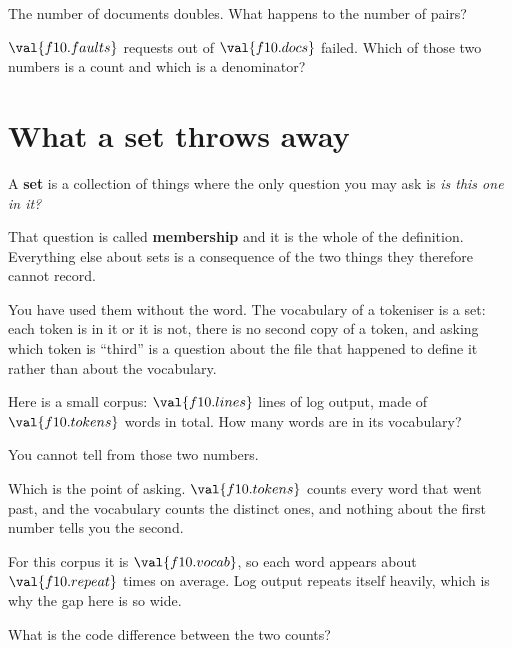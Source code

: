 \begin{quiz}
\item The number of documents doubles. What happens to the number of pairs?
\item $\val{f10.faults}$ requests out of $\val{f10.docs}$ failed. Which of
  those two numbers is a count and which is a denominator?
\end{quiz}

\section{What a set throws away}
\label{sec:F10-sets}

\begin{fr}
A \textbf{set} is a collection of things where the only question you may ask is
\emph{is this one in it?}

That question is called \textbf{membership} and it is the whole of the
definition. Everything else about sets is a consequence of the two things they
therefore cannot record.

You have used them without the word. The vocabulary of a tokeniser is a set:
each token is in it or it is not, there is no second copy of a token, and
asking which token is \enquote{third} is a question about the file that
happened to define it rather than about the vocabulary.

Here is a small corpus: $\val{f10.lines}$ lines of log output, made of
$\val{f10.tokens}$ words in total. How many words are in its vocabulary?
\nextframe
\end{fr}

\begin{fr}
\begin{ansblock}
You cannot tell from those two numbers.
\end{ansblock}

Which is the point of asking. $\val{f10.tokens}$ counts every word that went
past, and the vocabulary counts the distinct ones, and nothing about the first
number tells you the second.

For this corpus it is $\val{f10.vocab}$, so each word appears about
$\val{f10.repeat}$ times on average. Log output repeats itself heavily, which
is why the gap here is so wide.

What is the code difference between the two counts?
\nextframe
\end{fr}

